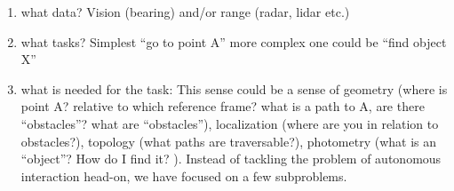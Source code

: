 \documentclass [PhD] {uclathes}
\begin{document}
\begin{enumerate}
\item what data? Vision (bearing) and/or range (radar, lidar etc.)
\item what tasks? Simplest ``go to point A'' more complex one could be ``find object X''
\item what is needed for the task: 
\fi
This sense could be a sense of geometry (where is point A? relative to which reference frame? what is a path to A, are there ``obstacles''? what are ``obstacles''),
localization (where are you in relation to obstacles?), topology (what paths are traversable?), photometry (what is an ``object''? How do I find it? 
).
Instead of tackling the problem of autonomous interaction head-on, we have focused on a few subproblems.


\end{enumerate}
\end{document}

